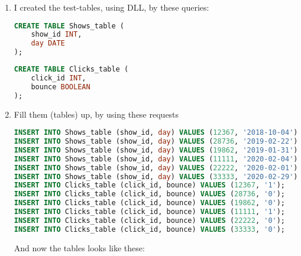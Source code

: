 \documentclass[14pt, a4paper]{extarticle}
\begin{document}
\begin{enumerate}
\item I created the test-tables, using DLL, by these queries:

\begin{lstlisting}[language=SQL]
CREATE TABLE Shows_table (
    show_id INT,
    day DATE
);       
\end{lstlisting}

\begin{lstlisting}[language=SQL]
CREATE TABLE Clicks_table (
    click_id INT,
    bounce BOOLEAN
);       
\end{lstlisting}

\item Fill them (tables) up, by using these requests

\begin{lstlisting}[language=SQL]
INSERT INTO Shows_table (show_id, day) VALUES (12367, '2018-10-04');
INSERT INTO Shows_table (show_id, day) VALUES (28736, '2019-02-22');
INSERT INTO Shows_table (show_id, day) VALUES (19862, '2019-01-31');
INSERT INTO Shows_table (show_id, day) VALUES (11111, '2020-02-04');
INSERT INTO Shows_table (show_id, day) VALUES (22222, '2020-02-01');
INSERT INTO Shows_table (show_id, day) VALUES (33333, '2020-02-29');
INSERT INTO Clicks_table (click_id, bounce) VALUES (12367, '1');
INSERT INTO Clicks_table (click_id, bounce) VALUES (28736, '0');
INSERT INTO Clicks_table (click_id, bounce) VALUES (19862, '0');
INSERT INTO Clicks_table (click_id, bounce) VALUES (11111, '1');
INSERT INTO Clicks_table (click_id, bounce) VALUES (22222, '0');
INSERT INTO Clicks_table (click_id, bounce) VALUES (33333, '0');      
\end{lstlisting}

And now the tables looks like these:


\end{enumerate}
\end{document}
